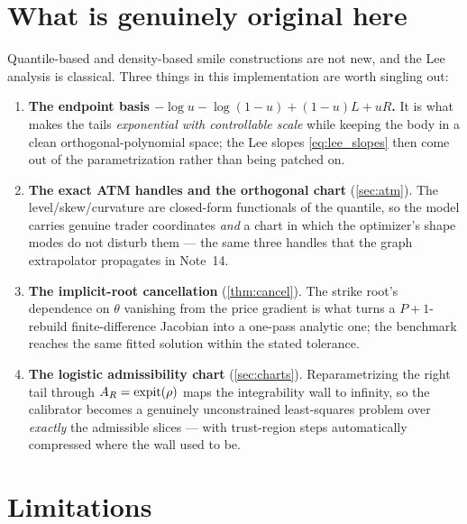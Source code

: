 \documentclass[11pt]{article}
\begin{document}
\section{What is genuinely original here}
\label{sec:original}

Quantile-based and density-based smile constructions are not new, and the Lee
analysis is classical. Three things in this implementation are worth singling
out:
\begin{enumerate}[leftmargin=1.6em]
\item \textbf{The endpoint basis $-\log u-\log(1-u)+(1-u)L+uR$.} It is what makes
the tails \emph{exponential with controllable scale} while keeping the body in a
clean orthogonal-polynomial space; the Lee slopes \eqref{eq:lee_slopes} then come
out of the parametrization rather than being patched on.
\item \textbf{The exact ATM handles and the orthogonal chart}
(\cref{sec:atm}). The level/skew/curvature are closed-form functionals of the
quantile, so the model carries genuine trader coordinates \emph{and} a chart in
which the optimizer's shape modes do not disturb them --- the same three handles
that the graph extrapolator propagates in Note~14.
\item \textbf{The implicit-root cancellation} (\cref{thm:cancel}). The strike
root's dependence on $\theta$ vanishing from the price gradient is what turns a
$P+1$-rebuild finite-difference Jacobian into a one-pass analytic one; the
benchmark reaches the same fitted solution within the stated tolerance.
\item \textbf{The logistic admissibility chart} (\cref{sec:charts}).
Reparametrizing the right tail through $A_R=\operatorname{expit}(\rho)$ maps the
integrability wall to infinity, so the calibrator becomes a genuinely
unconstrained least-squares problem over \emph{exactly} the admissible
slices --- with trust-region steps automatically compressed where the wall
used to be.
\end{enumerate}

\section{Limitations}
\label{sec:limits}
\end{document}
